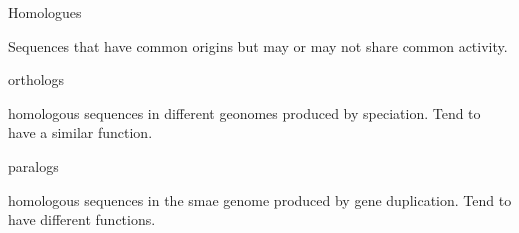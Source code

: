 
\begin{note}
    \begin{field}
        Homologues
    \end{field}
    \begin{field}
        Sequences that have common origins but may or may not share common
        activity.
    \end{field}
\end{note}

\begin{note}
    \begin{field}
        orthologs
    \end{field}
    \begin{field}
        homologous sequences in different geonomes produced by speciation.
        Tend to have a similar function.
    \end{field}
\end{note}

\begin{note}
    \begin{field}
        paralogs
    \end{field}
    \begin{field}
        homologous sequences in the smae genome produced by gene duplication.
        Tend to have different functions.
    \end{field}
\end{note}

